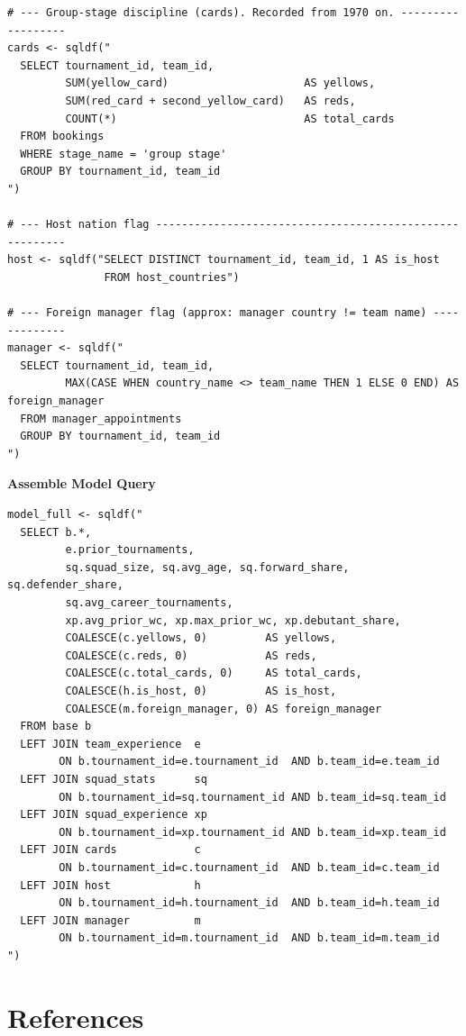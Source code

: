 \documentclass{article}
\begin{document}
\begin{lstlisting}
# --- Group-stage discipline (cards). Recorded from 1970 on. ------------------
cards <- sqldf("
  SELECT tournament_id, team_id,
         SUM(yellow_card)                     AS yellows,
         SUM(red_card + second_yellow_card)   AS reds,
         COUNT(*)                             AS total_cards
  FROM bookings
  WHERE stage_name = 'group stage'
  GROUP BY tournament_id, team_id
")

# --- Host nation flag --------------------------------------------------------
host <- sqldf("SELECT DISTINCT tournament_id, team_id, 1 AS is_host
               FROM host_countries")

# --- Foreign manager flag (approx: manager country != team name) -------------
manager <- sqldf("
  SELECT tournament_id, team_id,
         MAX(CASE WHEN country_name <> team_name THEN 1 ELSE 0 END) AS foreign_manager
  FROM manager_appointments
  GROUP BY tournament_id, team_id
")
\end{lstlisting}
\clearpage


\textbf{Assemble Model Query}
\vspace{0.8em}
\begin{lstlisting}
model_full <- sqldf("
  SELECT b.*,
         e.prior_tournaments,
         sq.squad_size, sq.avg_age, sq.forward_share, sq.defender_share,
         sq.avg_career_tournaments,
         xp.avg_prior_wc, xp.max_prior_wc, xp.debutant_share,
         COALESCE(c.yellows, 0)         AS yellows,
         COALESCE(c.reds, 0)            AS reds,
         COALESCE(c.total_cards, 0)     AS total_cards,
         COALESCE(h.is_host, 0)         AS is_host,
         COALESCE(m.foreign_manager, 0) AS foreign_manager
  FROM base b
  LEFT JOIN team_experience  e  
        ON b.tournament_id=e.tournament_id  AND b.team_id=e.team_id
  LEFT JOIN squad_stats      sq  
        ON b.tournament_id=sq.tournament_id AND b.team_id=sq.team_id
  LEFT JOIN squad_experience xp 
        ON b.tournament_id=xp.tournament_id AND b.team_id=xp.team_id
  LEFT JOIN cards            c  
        ON b.tournament_id=c.tournament_id  AND b.team_id=c.team_id
  LEFT JOIN host             h  
        ON b.tournament_id=h.tournament_id  AND b.team_id=h.team_id
  LEFT JOIN manager          m  
        ON b.tournament_id=m.tournament_id  AND b.team_id=m.team_id
")
\end{lstlisting}


\clearpage
\section{References}
\end{document}
